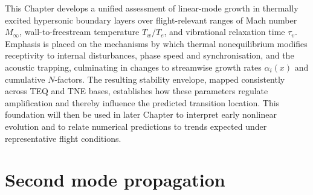 \begin{figure}[t]
    \centering
    \fontsize{8}{9}\selectfont
    \label{figure:wedgeflow}
\end{figure}

This Chapter develops a unified assessment of linear-mode growth in thermally excited hypersonic boundary layers over flight-relevant ranges of Mach number $M_\infty$, wall-to-freestream temperature $T_w/T_e$, and vibrational relaxation time $\tau_v$. Emphasis is placed on the mechanisms by which thermal nonequilibrium modifies receptivity to internal disturbances, phase speed and synchronisation, and the acoustic trapping, culminating in changes to streamwise growth rates $\alpha_i(x)$ and cumulative $N$-factors. The resulting stability envelope, mapped consistently across \gls{TEQ} and \gls{TNE} bases, establishes how these parameters regulate amplification and thereby influence the predicted transition location. This foundation will then be used in later Chapter to interpret early nonlinear evolution and to relate numerical predictions to trends expected under representative flight conditions.



\section{Second mode propagation}

